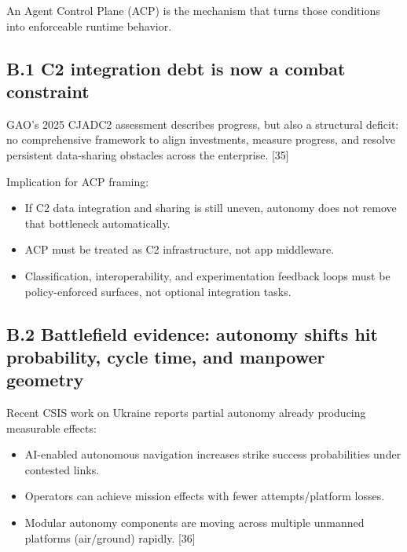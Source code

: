 \documentclass[
]{article}
\providecommand{\tightlist}{%
  \setlength{\itemsep}{0pt}\setlength{\parskip}{0pt}}
\begin{document}
An Agent Control Plane (ACP) is the mechanism that turns those
conditions into enforceable runtime behavior.

\hypertarget{b.1-c2-integration-debt-is-now-a-combat-constraint}{%
\subsection{B.1 C2 integration debt is now a combat
constraint}\label{b.1-c2-integration-debt-is-now-a-combat-constraint}}

GAO's 2025 CJADC2 assessment describes progress, but also a structural
deficit: no comprehensive framework to align investments, measure
progress, and resolve persistent data-sharing obstacles across the
enterprise. {[}35{]}

Implication for ACP framing:

\begin{itemize}
\tightlist
\item
  If C2 data integration and sharing is still uneven, autonomy does not
  remove that bottleneck automatically.
\item
  ACP must be treated as C2 infrastructure, not app middleware.
\item
  Classification, interoperability, and experimentation feedback loops
  must be policy-enforced surfaces, not optional integration tasks.
\end{itemize}

\hypertarget{b.2-battlefield-evidence-autonomy-shifts-hit-probability-cycle-time-and-manpower-geometry}{%
\subsection{B.2 Battlefield evidence: autonomy shifts hit probability,
cycle time, and manpower
geometry}\label{b.2-battlefield-evidence-autonomy-shifts-hit-probability-cycle-time-and-manpower-geometry}}

Recent CSIS work on Ukraine reports partial autonomy already producing
measurable effects:

\begin{itemize}
\tightlist
\item
  AI-enabled autonomous navigation increases strike success
  probabilities under contested links.
\item
  Operators can achieve mission effects with fewer attempts/platform
  losses.
\item
  Modular autonomy components are moving across multiple unmanned
  platforms (air/ground) rapidly. {[}36{]}
\end{itemize}
\end{document}

